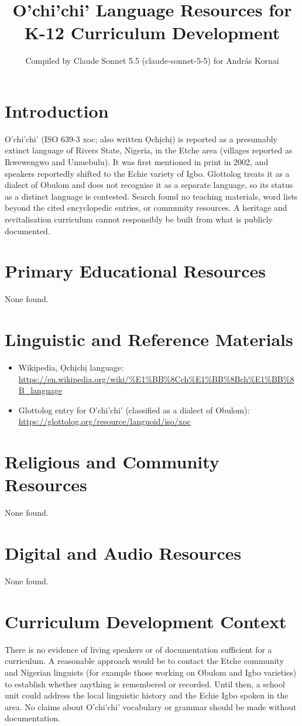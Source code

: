 \documentclass[12pt]{article}
\title{O'chi'chi' Language Resources for K-12 Curriculum Development}
\author{Compiled by Claude Sonnet 5.5 (claude-sonnet-5-5) for Andr\'as Kornai}
\date{}
\begin{document}
\maketitle

\section{Introduction}
O'chi'chi' (ISO 639-3 xoc; also written \d{O}ch\d{i}ch\d{i}) is reported as a presumably extinct language of Rivers State, Nigeria, in the Etche area (villages reported as Ikwewengwo and Umuebulu). It was first mentioned in print in 2002, and speakers reportedly shifted to the Echie variety of Igbo. Glottolog treats it as a dialect of Obulom and does not recognise it as a separate language, so its status as a distinct language is contested. Search found no teaching materials, word lists beyond the cited encyclopedic entries, or community resources. A heritage and revitalisation curriculum cannot responsibly be built from what is publicly documented.

\section{Primary Educational Resources}
None found.

\section{Linguistic and Reference Materials}
\begin{itemize}
\item Wikipedia, \d{O}ch\d{i}ch\d{i} language: \url{https://en.wikipedia.org/wiki/%E1%BB%8Cch%E1%BB%8Bch%E1%BB%8B_language}
\item Glottolog entry for O'chi'chi' (classified as a dialect of Obulom): \url{https://glottolog.org/resource/languoid/iso/xoc}
\end{itemize}

\section{Religious and Community Resources}
None found.

\section{Digital and Audio Resources}
None found.

\section{Curriculum Development Context}
There is no evidence of living speakers or of documentation sufficient for a curriculum. A reasonable approach would be to contact the Etche community and Nigerian linguists (for example those working on Obulom and Igbo varieties) to establish whether anything is remembered or recorded. Until then, a school unit could address the local linguistic history and the Echie Igbo spoken in the area. No claims about O'chi'chi' vocabulary or grammar should be made without documentation.
\end{document}

